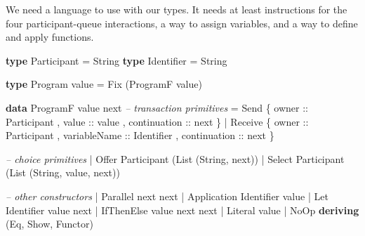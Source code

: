 \documentclass[runningheads]{llncs}
\newenvironment{Shaded}{}{}
\newcommand{\KeywordTok}[1]{\textcolor[rgb]{0.00,0.44,0.13}{\textbf{#1}}}
\newcommand{\DataTypeTok}[1]{\textcolor[rgb]{0.56,0.13,0.00}{#1}}
\newcommand{\CommentTok}[1]{\textcolor[rgb]{0.38,0.63,0.69}{\textit{#1}}}
\newcommand{\OtherTok}[1]{\textcolor[rgb]{0.00,0.44,0.13}{#1}}
\newcommand{\FunctionTok}[1]{\textcolor[rgb]{0.02,0.16,0.49}{#1}}
\newcommand{\NormalTok}[1]{#1}
\begin{document}
We need a language to use with our types. It needs at least instructions
for the four participant-queue interactions, a way to assign variables,
and a way to define and apply functions.

\begin{Shaded}
\begin{Highlighting}[]
\KeywordTok{type} \DataTypeTok{Participant} \FunctionTok{=} \DataTypeTok{String}
\KeywordTok{type} \DataTypeTok{Identifier} \FunctionTok{=} \DataTypeTok{String}

\KeywordTok{type} \DataTypeTok{Program}\NormalTok{ value }\FunctionTok{=} \DataTypeTok{Fix}\NormalTok{ (}\DataTypeTok{ProgramF}\NormalTok{ value) }

\KeywordTok{data} \DataTypeTok{ProgramF}\NormalTok{ value next }
    \CommentTok{-- transaction primitives}
    \FunctionTok{=} \DataTypeTok{Send} 
\NormalTok{        \{}\OtherTok{ owner ::} \DataTypeTok{Participant}
\NormalTok{        ,}\OtherTok{ value ::}\NormalTok{ value}
\NormalTok{        ,}\OtherTok{ continuation ::}\NormalTok{ next }
\NormalTok{        \}}
    \FunctionTok{|} \DataTypeTok{Receive} 
\NormalTok{        \{}\OtherTok{ owner ::} \DataTypeTok{Participant}
\NormalTok{        ,}\OtherTok{ variableName ::} \DataTypeTok{Identifier}
\NormalTok{        ,}\OtherTok{ continuation ::}\NormalTok{ next  }
\NormalTok{        \}}

    \CommentTok{-- choice primitives}
    \FunctionTok{|} \DataTypeTok{Offer} \DataTypeTok{Participant}\NormalTok{ (}\DataTypeTok{List}\NormalTok{ (}\DataTypeTok{String}\NormalTok{, next))}
    \FunctionTok{|} \DataTypeTok{Select} \DataTypeTok{Participant}\NormalTok{ (}\DataTypeTok{List}\NormalTok{ (}\DataTypeTok{String}\NormalTok{, value, next))}

    \CommentTok{-- other constructors }
    \FunctionTok{|} \DataTypeTok{Parallel}\NormalTok{ next next }
    \FunctionTok{|} \DataTypeTok{Application} \DataTypeTok{Identifier}\NormalTok{ value}
    \FunctionTok{|} \DataTypeTok{Let} \DataTypeTok{Identifier}\NormalTok{ value next }
    \FunctionTok{|} \DataTypeTok{IfThenElse}\NormalTok{ value next next}
    \FunctionTok{|} \DataTypeTok{Literal}\NormalTok{ value }
    \FunctionTok{|} \DataTypeTok{NoOp}
    \KeywordTok{deriving}\NormalTok{ (}\DataTypeTok{Eq}\NormalTok{, }\DataTypeTok{Show}\NormalTok{, }\DataTypeTok{Functor}\NormalTok{)}



\end{Highlighting}
\end{Shaded}
\end{document}
